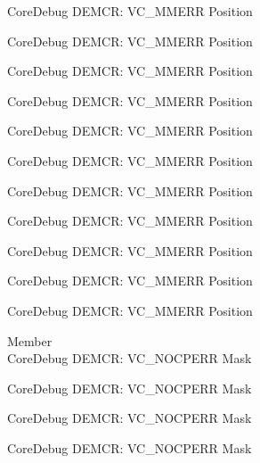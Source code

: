 \begin{DoxyRefList}
\label{deprecated__deprecated000211}%
%
Core\+Debug DEMCR\+: VC\+\_\+\+MMERR Position 

\label{deprecated__deprecated000353}%
%
Core\+Debug DEMCR\+: VC\+\_\+\+MMERR Position 

\label{deprecated__deprecated000429}%
%
Core\+Debug DEMCR\+: VC\+\_\+\+MMERR Position 

\label{deprecated__deprecated000518}%
%
Core\+Debug DEMCR\+: VC\+\_\+\+MMERR Position 

\label{deprecated__deprecated000620}%
%
Core\+Debug DEMCR\+: VC\+\_\+\+MMERR Position 

\label{deprecated__deprecated000726}%
%
Core\+Debug DEMCR\+: VC\+\_\+\+MMERR Position 

\label{deprecated__deprecated000870}%
%
Core\+Debug DEMCR\+: VC\+\_\+\+MMERR Position 

\label{deprecated__deprecated001012}%
%
Core\+Debug DEMCR\+: VC\+\_\+\+MMERR Position 

\label{deprecated__deprecated001088}%
%
Core\+Debug DEMCR\+: VC\+\_\+\+MMERR Position 

\label{deprecated__deprecated001177}%
%
Core\+Debug DEMCR\+: VC\+\_\+\+MMERR Position 

\label{deprecated__deprecated001279}%
%
Core\+Debug DEMCR\+: VC\+\_\+\+MMERR Position  
\item[Member \doxylink{group___c_m_s_i_s___core_debug_ga03ee58b1b02fdbf21612809034562f1c}{Core\+Debug\+\_\+\+DEMCR\+\_\+\+VC\+\_\+\+NOCPERR\+\_\+\+Msk} ]\hfill \\
\label{deprecated__deprecated000066}%
%
Core\+Debug DEMCR\+: VC\+\_\+\+NOCPERR Mask 

\label{deprecated__deprecated000210}%
%
Core\+Debug DEMCR\+: VC\+\_\+\+NOCPERR Mask 

\label{deprecated__deprecated000352}%
%
Core\+Debug DEMCR\+: VC\+\_\+\+NOCPERR Mask 

\label{deprecated__deprecated000428}%
%
Core\+Debug DEMCR\+: VC\+\_\+\+NOCPERR Mask 


\end{DoxyRefList}
